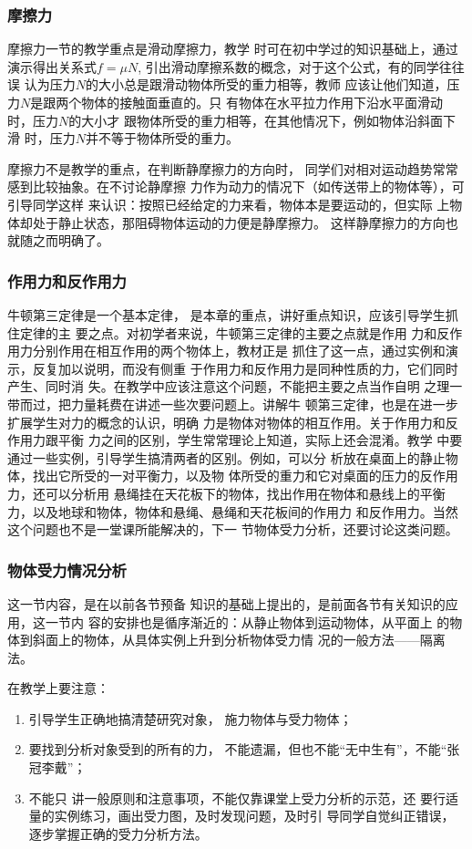 \subsubsection{摩擦力} 摩擦力一节的教学重点是滑动摩擦力，教学
时可在初中学过的知识基础上，通过演示得出关系式$f=\mu N$,
引出滑动摩擦系数的概念，对于这个公式，有的同学往往误
认为压力$N$的大小总是跟滑动物体所受的重力相等，教师
应该让他们知道，压力$N$是跟两个物体的接触面垂直的。只
有物体在水平拉力作用下沿水平面滑动时，压力$N$的大小才
跟物体所受的重力相等，在其他情况下，例如物体沿斜面下滑
时，压力$N$并不等于物体所受的重力。

摩擦力不是教学的重点，在判断静摩擦力的方向时，
同学们对相对运动趋势常常感到比较抽象。在不讨论静摩擦
力作为动力的情况下（如传送带上的物体等），可引导同学这样
来认识：按照已经给定的力来看，物体本是要运动的，但实际
上物体却处于静止状态，那阻碍物体运动的力便是静摩擦力。
这样静摩擦力的方向也就随之而明确了。

\subsubsection{作用力和反作用力}
牛顿第三定律是一个基本定律，
是本章的重点，讲好重点知识，应该引导学生抓住定律的主
要之点。对初学者来说，牛顿第三定律的主要之点就是作用
力和反作用力分别作用在相互作用的两个物体上，教材正是
抓住了这一点，通过实例和演示，反复加以说明，而没有侧重
于作用力和反作用力是同种性质的力，它们同时产生、同时消
失。在教学中应该注意这个问题，不能把主要之点当作自明
之理一带而过，把力量耗费在讲述一些次要问题上。讲解牛
顿第三定律，也是在进一步扩展学生对力的概念的认识，明确
力是物体对物体的相互作用。关于作用力和反作用力跟平衡
力之间的区别，学生常常理论上知道，实际上还会混淆。教学
中要通过一些实例，引导学生搞清两者的区别。例如，可以分
析放在桌面上的静止物体，找出它所受的一对平衡力，以及物
体所受的重力和它对桌面的压力的反作用力，还可以分析用
悬绳挂在天花板下的物体，找出作用在物体和悬线上的平衡
力，以及地球和物体，物体和悬绳、悬绳和天花板间的作用力
和反作用力。当然这个问题也不是一堂课所能解决的，下一
节物体受力分析，还要讨论这类问题。

\subsubsection{物体受力情况分析}  这一节内容，是在以前各节预备
知识的基础上提出的，是前面各节有关知识的应用，这一节内
容的安排也是循序渐近的：从静止物体到运动物体，从平面上
的物体到斜面上的物体，从具体实例上升到分析物体受力情
况的一般方法——隔离法。

在教学上要注意：
\begin{enumerate}
    \item 引导学生正确地搞清楚研究对象，
施力物体与受力物体；
\item 要找到分析对象受到的所有的力，
不能遗漏，但也不能“无中生有”，不能“张冠李戴”；
\item 不能只
讲一般原则和注意事项，不能仅靠课堂上受力分析的示范，还
要行适量的实例练习，画出受力图，及时发现问题，及时引
导同学自觉纠正错误，逐步掌握正确的受力分析方法。
\end{enumerate}

